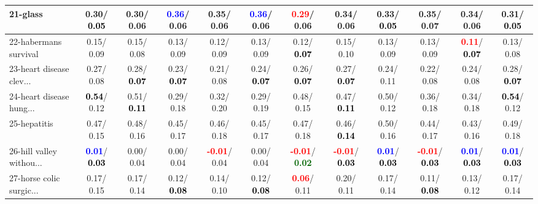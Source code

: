 \begin{table}[h]
\begin{center}
{\begin{tabular}{lc|c|c|c|c|c|c|c|c|c|c}
21-glass &   0.30/\textcolor{black}{\textbf{  0.05}} &   0.30/  0.06 & \textcolor{blue}{\textbf{  0.36}}/  0.06 &   0.35/  0.06 & \textcolor{blue}{\textbf{  0.36}}/  0.06 & \textcolor{red}{\textbf{  0.29}}/  0.06 &   0.34/  0.06 &   0.33/\textcolor{black}{\textbf{  0.05}} &   0.35/  0.07 &   0.34/  0.06 &   0.31/\textcolor{black}{\textbf{  0.05}} \\ \hline
22-habermans survival &   0.15/  0.09 &   0.15/  0.08 &   0.13/  0.09 &   0.12/  0.09 &   0.13/  0.09 &   0.12/\textcolor{black}{\textbf{  0.07}} &   0.15/  0.10 &   0.13/  0.09 &   0.13/  0.09 & \textcolor{red}{\textbf{  0.11}}/\textcolor{black}{\textbf{  0.07}} &   0.13/  0.08 \\
23-heart disease clev... &   0.27/  0.08 &   0.28/\textcolor{black}{\textbf{  0.07}} &   0.23/\textcolor{black}{\textbf{  0.07}} &   0.21/  0.08 &   0.24/\textcolor{black}{\textbf{  0.07}} &   0.26/\textcolor{black}{\textbf{  0.07}} &   0.27/\textcolor{black}{\textbf{  0.07}} &   0.24/  0.11 &   0.22/  0.08 &   0.24/  0.08 &   0.28/\textcolor{black}{\textbf{  0.07}} \\
24-heart disease hung... & \textcolor{black}{\textbf{  0.54}}/  0.12 &   0.51/\textcolor{black}{\textbf{  0.11}} &   0.29/  0.18 &   0.32/  0.20 &   0.29/  0.19 &   0.48/  0.15 &   0.47/\textcolor{black}{\textbf{  0.11}} &   0.50/  0.12 &   0.36/  0.18 &   0.34/  0.18 & \textcolor{black}{\textbf{  0.54}}/  0.12 \\
25-hepatitis &   0.47/  0.15 &   0.48/  0.16 &   0.45/  0.17 &   0.46/  0.18 &   0.45/  0.17 &   0.47/  0.18 &   0.46/\textcolor{black}{\textbf{  0.14}} &   0.50/  0.16 &   0.44/  0.17 &   0.43/  0.16 &   0.49/  0.18 \\
26-hill valley withou... & \textcolor{blue}{\textbf{  0.01}}/\textcolor{black}{\textbf{  0.03}} &   0.00/  0.04 &   0.00/  0.04 & \textcolor{red}{\textbf{ -0.01}}/  0.04 &   0.00/  0.04 & \textcolor{red}{\textbf{ -0.01}}/\textcolor{darkgreen}{\textbf{  0.02}} & \textcolor{red}{\textbf{ -0.01}}/\textcolor{black}{\textbf{  0.03}} & \textcolor{blue}{\textbf{  0.01}}/\textcolor{black}{\textbf{  0.03}} & \textcolor{red}{\textbf{ -0.01}}/\textcolor{black}{\textbf{  0.03}} & \textcolor{blue}{\textbf{  0.01}}/\textcolor{black}{\textbf{  0.03}} & \textcolor{blue}{\textbf{  0.01}}/\textcolor{black}{\textbf{  0.03}} \\
27-horse colic surgic... &   0.17/  0.15 &   0.17/  0.14 &   0.12/\textcolor{black}{\textbf{  0.08}} &   0.14/  0.10 &   0.12/\textcolor{black}{\textbf{  0.08}} & \textcolor{red}{\textbf{  0.06}}/  0.11 &   0.20/  0.11 &   0.17/  0.14 &   0.11/\textcolor{black}{\textbf{  0.08}} &   0.13/  0.12 &   0.17/  0.14 \\

\end{tabular}}
\end{center}
\end{table}
